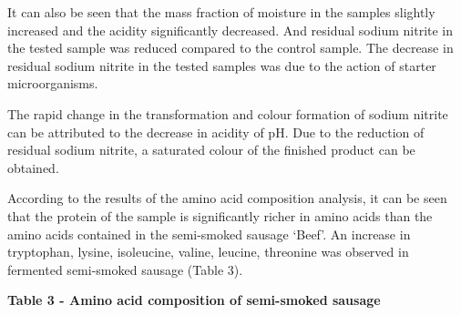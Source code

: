 It can also be seen that the mass fraction of moisture in the samples
slightly increased and the acidity significantly decreased. And residual
sodium nitrite in the tested sample was reduced compared to the control
sample. The decrease in residual sodium nitrite in the tested samples
was due to the action of starter microorganisms.

The rapid change in the transformation and colour formation of sodium
nitrite can be attributed to the decrease in acidity of pH. Due to the
reduction of residual sodium nitrite, a saturated colour of the finished
product can be obtained.

According to the results of the amino acid composition analysis, it can
be seen that the protein of the sample is significantly richer in amino
acids than the amino acids contained in the semi-smoked sausage `Beef'.
An increase in tryptophan, lysine, isoleucine, valine, leucine,
threonine was observed in fermented semi-smoked sausage (Table 3).

{\bfseries Table 3 - Amino acid composition of semi-smoked sausage}

